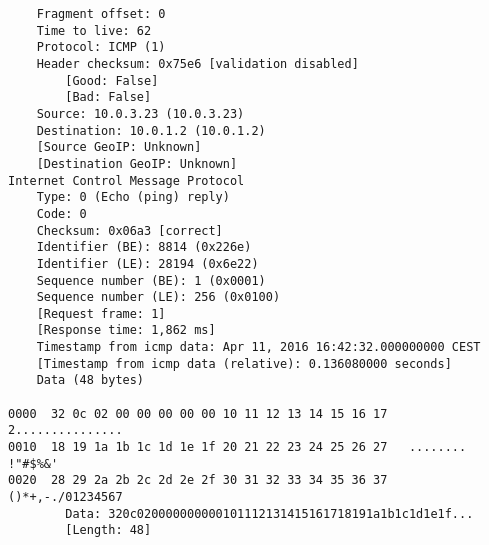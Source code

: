 \begin{lstlisting}
    Fragment offset: 0
    Time to live: 62
    Protocol: ICMP (1)
    Header checksum: 0x75e6 [validation disabled]
        [Good: False]
        [Bad: False]
    Source: 10.0.3.23 (10.0.3.23)
    Destination: 10.0.1.2 (10.0.1.2)
    [Source GeoIP: Unknown]
    [Destination GeoIP: Unknown]
Internet Control Message Protocol
    Type: 0 (Echo (ping) reply)
    Code: 0
    Checksum: 0x06a3 [correct]
    Identifier (BE): 8814 (0x226e)
    Identifier (LE): 28194 (0x6e22)
    Sequence number (BE): 1 (0x0001)
    Sequence number (LE): 256 (0x0100)
    [Request frame: 1]
    [Response time: 1,862 ms]
    Timestamp from icmp data: Apr 11, 2016 16:42:32.000000000 CEST
    [Timestamp from icmp data (relative): 0.136080000 seconds]
    Data (48 bytes)

0000  32 0c 02 00 00 00 00 00 10 11 12 13 14 15 16 17   2...............
0010  18 19 1a 1b 1c 1d 1e 1f 20 21 22 23 24 25 26 27   ........ !"#$%&'
0020  28 29 2a 2b 2c 2d 2e 2f 30 31 32 33 34 35 36 37   ()*+,-./01234567
        Data: 320c020000000000101112131415161718191a1b1c1d1e1f...
        [Length: 48]
\end{lstlisting}
